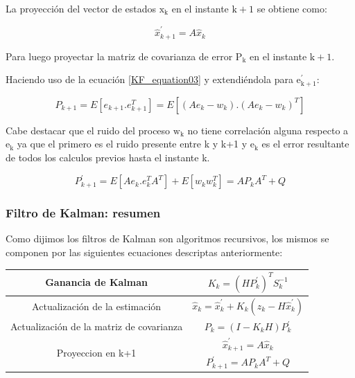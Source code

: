 \documentclass[10pt,a4paper]{article}
\begin{document}
    \noindent La proyección del vector de estados $\mathrm{x_k}$ en el instante 
    $\mathrm{k+1}$ se obtiene como:
	
	\begin{equation}
		\hat{x}^\prime_{k+1} = A \hat{x}_k 
		\label{x_k_projection}
	\end{equation}	
	
    \noindent Para luego proyectar la matriz de covarianza de error
    $\mathrm{P_k}$ en el instante $\mathrm{k+1}$.
	
	\noindent Haciendo uso de la ecuación \ref{KF_equation03} y extendiéndola 
    para $\mathrm{e^\prime_{k+1}}$:
	
	\begin{equation}
		P_{k+1} = E[e_{k+1}.e_{k+1}^{T}] = E[(A e_k-w_k).(A  e_k-w_k)^{T}]
		\label{projection_p_k_aux}
	\end{equation}	
	
    \noindent Cabe destacar que el ruido del proceso $\mathrm{w_k}$ no tiene 
    correlación alguna respecto a $\mathrm{e_k}$ ya que el primero es el ruido 
    presente entre k y k+1 y $\mathrm{e_k}$ es el error resultante de todos los 
    calculos previos hasta el instante k.
	
	\begin{equation}
		P^\prime_{k+1} = E[A e_{k}.e_{k}^{T}A^{T}]+ E[w_k w_k^{T}]= A P_k A^{T} + Q
		\label{projection_p_k}
	\end{equation}	
	
	\subsubsection{Filtro de Kalman: resumen}
	
	Como dijimos los filtros de Kalman son algoritmos recursivos, los mismos se componen por las siguientes ecuaciones descriptas anteriormente:
	
	\begin{table}[h!]
		\centering
		\begin{tabular}{|c|c|}
			\hline
			\rule{0pt}{4ex}	Ganancia de Kalman 							& $K_k = (H P^\prime_k)^T S_k^{-1}$  \\ \hline
			\rule{0pt}{4ex}	Actualización de la estimación			    &  $\hat{x}_k = \hat{x}^\prime_k + K_k (z_k - H\hat{x}^\prime_k)$\\ \hline
			\rule{0pt}{4ex}	Actualización de la matriz de covarianza    & $P_k = (I - K_k H) P^\prime_k$ \\ \hline
			\multirow{2}{*}{Proyeccion en k+1}        		  			& \rule{0pt}{4ex} $\hat{x}^\prime_{k+1} = A \hat{x}_k$ \\ \cline{2-2}
			& \rule{0pt}{4ex} $P^\prime_{k+1} = A P_k A^{T} + Q$ \\ \hline
		\end{tabular}
		\label{Ecuaciones_Kalman}
	\end{table}
	
\end{document}
